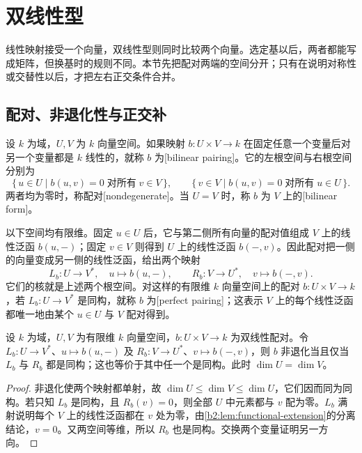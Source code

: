 
\section{双线性型}
\label{b2:sec:1001}

线性映射接受一个向量，双线性型则同时比较两个向量。选定基以后，两者都能写成矩阵，但换基时的规则不同。本节先把配对两端的空间分开；只有在说明对称性或交替性以后，才把左右正交条件合并。

%
%

\subsection{配对、非退化性与正交补}
\label{b2:subsec:1001:01}

\begin{definition}\label{b2:def:bilinear-pairing}
	设 \(k\) 为域，\(U,V\) 为 \(k\) 向量空间。如果映射 \(b:U\times V\to k\) 在固定任意一个变量后对另一个变量都是 \(k\) 线性的，就称 \(b\) 为[bilinear pairing]。它的左根空间与右根空间分别为
	\[
		\{\,u\in U\mid b(u,v)=0\;\text{对所有}\;v\in V\,\},\qquad \{\,v\in V\mid b(u,v)=0\;\text{对所有}\;u\in U\,\}.
	\]
	两者均为零时，称配对[nondegenerate]。当 \(U=V\) 时，称 \(b\) 为 \(V\) 上的[bilinear form]。
\end{definition}

以下空间均有限维。固定 \(u\in U\) 后，它与第二侧所有向量的配对值组成 \(V\) 上的线性泛函 \(b(u,-)\)；固定 \(v\in V\) 则得到 \(U\) 上的线性泛函 \(b(-,v)\)。因此配对把一侧的向量变成另一侧的线性泛函，给出两个映射
\[
	L_b:U\longrightarrow V^*,\quad u\longmapsto b(u,-), \qquad R_b:V\longrightarrow U^*,\quad v\longmapsto b(-,v).
\]
它们的核就是上述两个根空间。对这样的有限维 \(k\) 向量空间上的配对 \(b:U\times V\to k\)，若 \(L_b:U\to V^*\) 是同构，就称 \(b\) 为[perfect pairing]；这表示 \(V\) 上的每个线性泛函都唯一地由某个 \(u\in U\) 与 \(V\) 配对得到。

\begin{proposition}\label{b2:prop:finite-perfect-pairing}
	设 \(k\) 为域，\(U,V\) 为有限维 \(k\) 向量空间，\(b:U\times V\to k\) 为双线性配对。令 \(L_b:U\to V^*\)、\(u\mapsto b(u,-)\) 及 \(R_b:V\to U^*\)、\(v\mapsto b(-,v)\)，则 \(b\) 非退化当且仅当 \(L_b\) 与 \(R_b\) 都是同构；这也等价于其中任一个是同构。此时 \(\dim U=\dim V\)。
\end{proposition}
\begin{proof}
	非退化使两个映射都单射，故 \(\dim U\le\dim V\le\dim U\)，它们因而同为同构。若只知 \(L_b\) 是同构，且 \(R_b(v)=0\)，则全部 \(U\) 中元素都与 \(v\) 配为零。\(L_b\) 满射说明每个 \(V\) 上的线性泛函都在 \(v\) 处为零，由\cref{b2:lem:functional-extension}的分离结论，\(v=0\)。又两空间等维，所以 \(R_b\) 也是同构。交换两个变量证明另一方向。
\end{proof}


